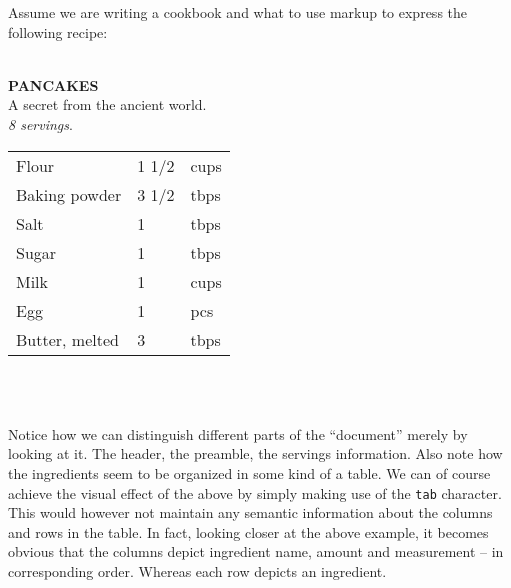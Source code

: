 \documentclass{scrreprt}
\newcommand{\tab}{\hspace*{6pt}}
\newenvironment{example}
{ \hrulefill \vspace{12pt} \\ }
{ \\\\ \vspace{12pt} \hrulefill }
\begin{document}
Assume we are writing a cookbook and what to use markup to express the following recipe:

\begin{example}
\tab\tab\tab \textbf{PANCAKES}\\
\tab\tab\tab A secret from the ancient world.\\
\tab\tab\tab \emph{8 servings}.\\

\begin{tabular}{l l l}
Flour & 1 1/2 & cups \\
Baking powder & 3 1/2 & tbps \\
Salt & 1 & tbps \\
Sugar & 1 & tbps \\
Milk & 1 & cups \\
Egg & 1 & pcs\\
Butter, melted & 3 & tbps \\
\end{tabular}
\end{example}

Notice how we can distinguish different parts of the ``document'' merely by looking at it. The header, the preamble, the servings information. Also note how the ingredients seem to be organized in some kind of a table. We can of course achieve the visual effect of the above by simply making use of the \texttt{tab} character. This would however not maintain any semantic information about the columns and rows in the table. In fact, looking closer at the above example, it becomes obvious that the columns depict ingredient name, amount and measurement -- in corresponding order. Whereas each row depicts an ingredient. 
\end{document}
